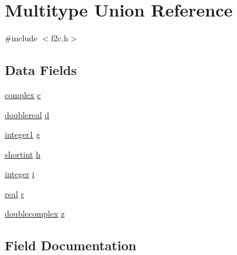 \hypertarget{union_multitype}{}\section{Multitype Union Reference}
\label{union_multitype}


{\ttfamily \#include $<$f2c.\+h$>$}

\subsection*{Data Fields}
\begin{DoxyCompactItemize}
\item 
\hyperlink{structcomplex}{complex} \hyperlink{union_multitype_a30e3bb4e990a88a087fad898df096868}{c}
\item 
\hyperlink{dependencies_2third-party_2clapack_23_82_81_2_f2_c_l_i_b_s_2libf2c_2f2c_8h_a1e69afaa4e6077b67397e6c36454b97a}{doublereal} \hyperlink{union_multitype_ad14eee30c207909f64d8adc2110dc8a1}{d}
\item 
\hyperlink{dependencies_2third-party_2clapack_23_82_81_2_f2_c_l_i_b_s_2libf2c_2f2c_8h_abe960e333f9b66f7766535cc76140caf}{integer1} \hyperlink{union_multitype_a6144d7589398ee0202ee7f4fbfad4f21}{g}
\item 
\hyperlink{dependencies_2third-party_2clapack_23_82_81_2_f2_c_l_i_b_s_2libf2c_2f2c_8h_a90891215359ad3bd66ef0a5a91f91f9d}{shortint} \hyperlink{union_multitype_a556d63188675caed2d40a14cbfe740e8}{h}
\item 
\hyperlink{dependencies_2third-party_2clapack_23_82_81_2_f2_c_l_i_b_s_2libf2c_2f2c_8h_a99e088ad9e1bf72a6c0e148a6c2b7012}{integer} \hyperlink{union_multitype_a8b913dac6031042a8f5192ee033bb5f1}{i}
\item 
\hyperlink{dependencies_2third-party_2clapack_23_82_81_2_f2_c_l_i_b_s_2libf2c_2f2c_8h_a031f8951175b43076c2084a6c2173410}{real} \hyperlink{union_multitype_ab4eba1c6e83e32ee5b08b7550b46907c}{r}
\item 
\hyperlink{structdoublecomplex}{doublecomplex} \hyperlink{union_multitype_aa031f83e1db7e8f751458cebe7b9d897}{z}
\end{DoxyCompactItemize}


\subsection{Field Documentation}
\mbox{\label{union_multitype_a30e3bb4e990a88a087fad898df096868}} 
